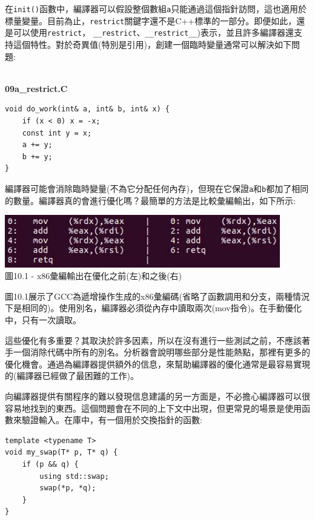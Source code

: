 在\texttt{init()}函數中，編譯器可以假設整個數組\texttt{a}只能通過這個指針訪問，這也適用於標量變量。目前為止，\texttt{restrict}關鍵字還不是C++標準的一部分。即便如此，還是可以使用\texttt{restrict}， \texttt{\_\_restrict}、\texttt{\_\_restrict\_\_})表示，並且許多編譯器還支持這個特性。對於奇異值(特別是引用)，創建一個臨時變量通常可以解決如下問題:

\hspace*{\fill} \\ %
\noindent
\textbf{09a\_restrict.C}
\begin{lstlisting}[style=styleCXX]
void do_work(int& a, int& b, int& x) {
	if (x < 0) x = -x;
	const int y = x;
	a += y;
	b += y;
}
\end{lstlisting}

編譯器可能會消除臨時變量(不為它分配任何內存)，但現在它保證\texttt{a}和\texttt{b}都加了相同的數量。編譯器真的會進行優化嗎？最簡單的方法是比較彙編輸出，如下所示:

\begin{center}
\includegraphics[width=0.9\textwidth]{content/3/chapter10/images/1.jpg}\\
圖10.1 - x86彙編輸出在優化之前(左)和之後(右)
\end{center}

圖10.1展示了GCC為遞增操作生成的x86彙編碼(省略了函數調用和分支，兩種情況下是相同的)。使用別名，編譯器必須從內存中讀取兩次(mov指令)。在手動優化中，只有一次讀取。

這些優化有多重要？其取決於許多因素，所以在沒有進行一些測試之前，不應該著手一個消除代碼中所有的別名。分析器會說明哪些部分是性能熱點，那裡有更多的優化機會。通過為編譯器提供額外的信息，來幫助編譯器的優化通常是最容易實現的(編譯器已經做了最困難的工作)。 

向編譯器提供有關程序的難以發現信息建議的另一方面是，不必擔心編譯器可以很容易地找到的東西。這個問題會在不同的上下文中出現，但更常見的場景是使用函數來驗證輸入。在庫中，有一個用於交換指針的函數:

\begin{lstlisting}[style=styleCXX]
template <typename T>
void my_swap(T* p, T* q) {
	if (p && q) {
		using std::swap;
		swap(*p, *q);
	}
}
\end{lstlisting}

